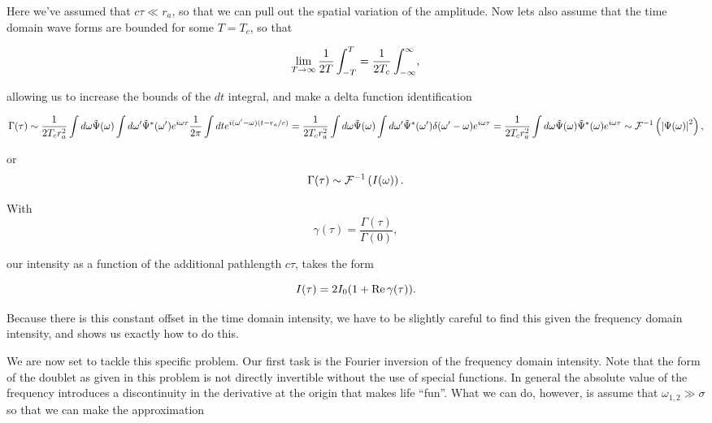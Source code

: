 {Here we've assumed that $c \tau \ll r_a$, so that we can pull out the spatial variation of the amplitude.  Now lets also assume that the time domain wave forms are bounded for some $T = T_c$, so that

\begin{dmath}\label{eqn:modernOptics:problemSet3:1:140}
\lim_{T \rightarrow \infty} \inv{2T} \int_{-T}^T = \inv{2 T_c} \int_{-\infty}^\infty,
\end{dmath}

allowing us to increase the bounds of the $dt$ integral, and make a delta function identification

\begin{dmath}\label{eqn:modernOptics:problemSet3:1:120b}
\Gamma(\tau) \sim
\inv{2 T_c r_a^2}
\int d\omega \tilde{\Psi}(\omega)
\int d\omega' \tilde{\Psi}^\conj(\omega')
e^{i \omega \tau}
\inv{2\pi}
\int
dt
e^{i (\omega' - \omega)( t - r_a/c )}
=
\inv{2 T_c r_a^2}
\int d\omega \tilde{\Psi}(\omega)
\int d\omega' \tilde{\Psi}^\conj(\omega') \delta(\omega' - \omega)
e^{i \omega \tau}
=
\inv{2 T_c r_a^2}
\int d\omega \tilde{\Psi}(\omega)
\tilde{\Psi}^\conj(\omega)
e^{i \omega \tau}
\sim \FF^{-1} \left( \Abs{\Psi(\omega)}^2 \right),
\end{dmath}

or
\begin{dmath}\label{eqn:modernOptics:problemSet3:1:180}
\Gamma(\tau) \sim \FF^{-1} \left( I(\omega) \right).
\end{dmath}

With
\begin{dmath}\label{eqn:modernOptics:problemSet3:1:200}
\gamma(\tau) = \frac{\Gamma(\tau)}{\Gamma(0)},
\end{dmath}

our intensity  as a function of the additional pathlength $c \tau$, takes the form

\begin{dmath}\label{eqn:modernOptics:problemSet3:1:220}
I(\tau) = 2 I_0( 1 + \Real \gamma(\tau) ).
\end{dmath}

Because there is this constant offset in the time domain intensity, we have to be slightly careful to find this given the frequency domain intensity, and  shows us exactly how to do this.


We are now set to tackle this specific problem.  Our first task is the Fourier inversion of the frequency domain intensity.  Note that the form of the doublet as given in this problem is not directly invertible without the use of special functions.  In general the absolute value of the frequency introduces a discontinuity in the derivative at the origin that makes life ``fun''.  What we can do, however, is assume that $\omega_{1,2} \gg \sigma$ so that we can make the approximation

}
